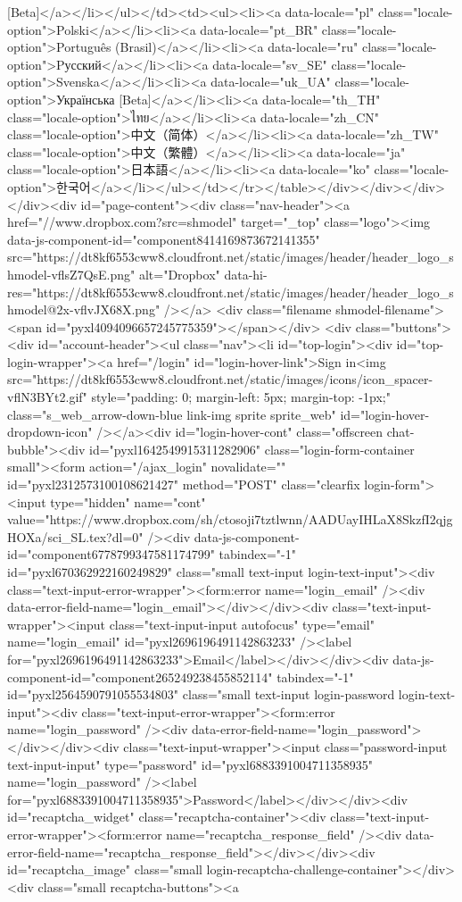 {[Beta]</a></li></ul></td><td><ul><li><a data-locale="pl" class="locale-option">Polski</a></li><li><a data-locale="pt_BR" class="locale-option">Português (Brasil)</a></li><li><a data-locale="ru" class="locale-option">Pусский</a></li><li><a data-locale="sv_SE" class="locale-option">Svenska</a></li><li><a data-locale="uk_UA" class="locale-option">Українська [Beta]</a></li><li><a data-locale="th_TH" class="locale-option">ไทย</a></li><li><a data-locale="zh_CN" class="locale-option">中文（简体）</a></li><li><a data-locale="zh_TW" class="locale-option">中文（繁體）</a></li><li><a data-locale="ja" class="locale-option">日本語</a></li><li><a data-locale="ko" class="locale-option">한국어</a></li></ul></td></tr></table></div></div></div></div><div id="page-content"><div class="nav-header"><a href="//www.dropbox.com?src=shmodel" target="_top" class="logo"><img data-js-component-id="component8414169873672141355" src="https://dt8kf6553cww8.cloudfront.net/static/images/header/header_logo_shmodel-vflsZ7QsE.png" alt="Dropbox" data-hi-res="https://dt8kf6553cww8.cloudfront.net/static/images/header/header_logo_shmodel@2x-vflvJX68X.png" /></a> <div class="filename shmodel-filename"><span id="pyxl4094096657245775359"></span></div> <div class="buttons"> <div id="account-header"><ul class="nav"><li id="top-login"><div id="top-login-wrapper"><a href="/login" id="login-hover-link">Sign in<img src="https://dt8kf6553cww8.cloudfront.net/static/images/icons/icon_spacer-vflN3BYt2.gif" style="padding: 0; margin-left: 5px; margin-top: -1px;" class="s_web_arrow-down-blue link-img sprite sprite_web" id="login-hover-dropdown-icon" /></a><div id="login-hover-cont" class="offscreen chat-bubble"><div id="pyxl1642549915311282906" class="login-form-container  small"><form action="/ajax_login" novalidate="" id="pyxl2312573100108621427" method="POST" class="clearfix login-form"><input type="hidden" name="cont" value="https://www.dropbox.com/sh/ctosoji7tztlwnn/AADUayIHLaX8SkzfI2qjgHOXa/sci_SL.tex?dl=0" /><div data-js-component-id="component6778799347581174799" tabindex="-1" id="pyxl670362922160249829" class="small text-input login-text-input"><div class="text-input-error-wrapper"><form:error name="login_email" /><div data-error-field-name="login_email"></div></div><div class="text-input-wrapper"><input class="text-input-input autofocus" type="email" name="login_email" id="pyxl2696196491142863233" /><label for="pyxl2696196491142863233">Email</label></div></div><div data-js-component-id="component265249238455852114" tabindex="-1" id="pyxl2564590791055534803" class="small text-input login-password login-text-input"><div class="text-input-error-wrapper"><form:error name="login_password" /><div data-error-field-name="login_password"></div></div><div class="text-input-wrapper"><input class="password-input text-input-input" type="password" id="pyxl6883391004711358935" name="login_password" /><label for="pyxl6883391004711358935">Password</label></div></div><div id="recaptcha_widget" class="recaptcha-container"><div class="text-input-error-wrapper"><form:error name="recaptcha_response_field" /><div data-error-field-name="recaptcha_response_field"></div></div><div id="recaptcha_image" class="small login-recaptcha-challenge-container"></div><div class="small recaptcha-buttons"><a }
